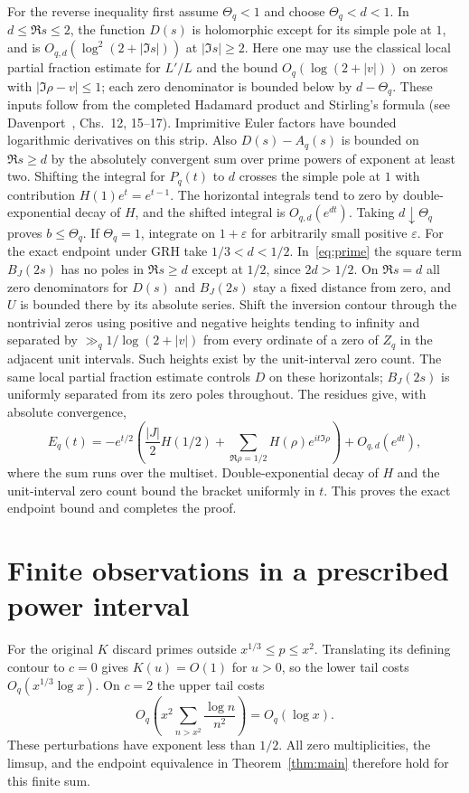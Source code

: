 \documentclass[11pt]{article}
\newcommand{\eps}{\varepsilon}
\begin{document}
For the reverse inequality first assume $\Theta_q<1$ and choose $\Theta_q<d<1$. In $d\le\Re s\le2$, the function $D(s)$ is holomorphic except for its simple pole at $1$, and is $O_{q,d}(\log^2(2+|\Im s|))$ at $|\Im s|\ge2$. Here one may use the classical local partial fraction estimate for $L'/L$ and the bound $O_q(\log(2+|v|))$ on zeros with $|\Im\rho-v|\le1$; each zero denominator is bounded below by $d-\Theta_q$. These inputs follow from the completed Hadamard product and Stirling's formula (see Davenport~\cite{davenport}, Chs.~12, 15--17). Imprimitive Euler factors have bounded logarithmic derivatives on this strip. Also $D(s)-A_q(s)$ is bounded on $\Re s\ge d$ by the absolutely convergent sum over prime powers of exponent at least two. Shifting the integral for $P_q(t)$ to $d$ crosses the simple pole at $1$ with contribution $H(1)e^t=e^{t-1}$. The horizontal integrals tend to zero by double-exponential decay of $H$, and the shifted integral is $O_{q,d}(e^{dt})$. Taking $d\downarrow\Theta_q$ proves $b\le\Theta_q$. If $\Theta_q=1$, integrate on $1+\eps$ for arbitrarily small positive $\eps$. For the exact endpoint under GRH take $1/3<d<1/2$. In~\eqref{eq:prime} the square term $B_J(2s)$ has no poles in $\Re s\ge d$ except at $1/2$, since $2d>1/2$. On $\Re s=d$ all zero denominators for $D(s)$ and $B_J(2s)$ stay a fixed distance from zero, and $U$ is bounded there by its absolute series. Shift the inversion contour through the nontrivial zeros using positive and negative heights tending to infinity and separated by $\gg_q 1/\log(2+|v|)$ from every ordinate of a zero of $Z_q$ in the adjacent unit intervals. Such heights exist by the unit-interval zero count. The same local partial fraction estimate controls $D$ on these horizontals; $B_J(2s)$ is uniformly separated from its zero poles throughout. The residues give, with absolute convergence,
\[
 E_q(t)=-e^{t/2}\left(\frac{|J|}{2}H(1/2)
 +\sum_{\Re\rho=1/2} H(\rho)e^{it\Im\rho}\right)+O_{q,d}(e^{dt}),
\]
where the sum runs over the multiset. Double-exponential decay of $H$ and the unit-interval zero count bound the bracket uniformly in $t$. This proves the exact endpoint bound and completes the proof.

\section{Finite observations in a prescribed power interval}

For the original $K$ discard primes outside $x^{1/3}\le p\le x^2$. Translating its defining contour to $c=0$ gives $K(u)=O(1)$ for $u>0$, so the lower tail costs $O_q(x^{1/3}\log x)$. On $c=2$ the upper tail costs
\[
 O_q\left(x^2\sum_{n>x^2}\frac{\log n}{n^2}\right)=O_q(\log x).
\]
These perturbations have exponent less than $1/2$. All zero multiplicities, the limsup, and the endpoint equivalence in Theorem~\ref{thm:main} therefore hold for this finite sum.
\end{document}
